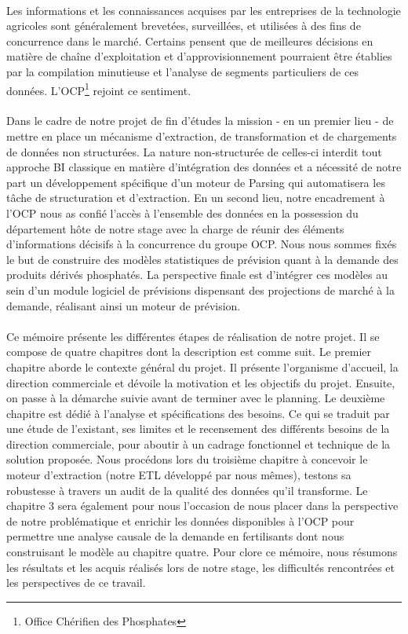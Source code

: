 \paragraph{}
Les informations et les connaissances acquises par les entreprises de la technologie agricoles sont généralement brevetées, surveillées, et utilisées à des fins de concurrence dans le marché. Certains pensent que de meilleures décisions en matière de chaîne d'exploitation et d'approvisionnement pourraient être établies par la compilation minutieuse et l'analyse de segments particuliers de ces données. L'OCP\footnote{Office Chérifien des Phosphates} rejoint ce sentiment.
\paragraph{}
 Dans le cadre de notre projet de fin d'études la mission - en un premier lieu - de mettre en place un mécanisme d'extraction, de transformation et de chargements de données non structurées. La nature non-structurée de celles-ci interdit tout approche BI classique en matière d'intégration des données et a nécessité de notre part un développement spécifique d'un moteur de Parsing qui automatisera les tâche de structuration et d'extraction. En un second lieu, notre encadrement à l'OCP nous as confié l'accès à l'ensemble des données en la possession du département hôte de notre stage avec la charge de réunir des éléments d'informations décisifs à la concurrence du groupe OCP. Nous nous sommes fixés le but de construire des modèles statistiques de prévision quant à la demande des produits dérivés phosphatés. La perspective finale est d'intégrer ces modèles au sein d'un module logiciel de prévisions dispensant des projections de marché à la demande, réalisant ainsi un moteur de prévision.
\paragraph{}
Ce mémoire présente les différentes étapes de réalisation de notre projet. Il se compose de quatre
chapitres dont la description est comme suit.
Le premier chapitre aborde le contexte général du projet. Il présente l’organisme d’accueil, la
direction commerciale et dévoile la motivation et les objectifs du projet. Ensuite, on passe à la
démarche suivie avant de terminer avec le planning.
Le deuxième chapitre est dédié à l’analyse et spécifications des besoins. Ce qui se traduit par
une étude de l’existant, ses limites et le recensement des différents besoins de la direction
commerciale, pour aboutir à un cadrage fonctionnel et technique de la solution proposée. Nous procédons lors du troisième chapitre à concevoir le moteur d'extraction (notre ETL développé par nous mêmes), testons sa robustesse à travers un audit de la qualité des données qu'il transforme. Le chapitre 3 sera également pour nous l'occasion de nous placer dans la perspective de notre problématique et enrichir les données disponibles à l'OCP pour permettre une analyse causale de la demande en fertilisants dont nous construisant le modèle au chapitre quatre. Pour clore ce mémoire, nous résumons les résultats et les acquis réalisés lors de notre stage, les
difficultés rencontrées et les perspectives de ce travail.
